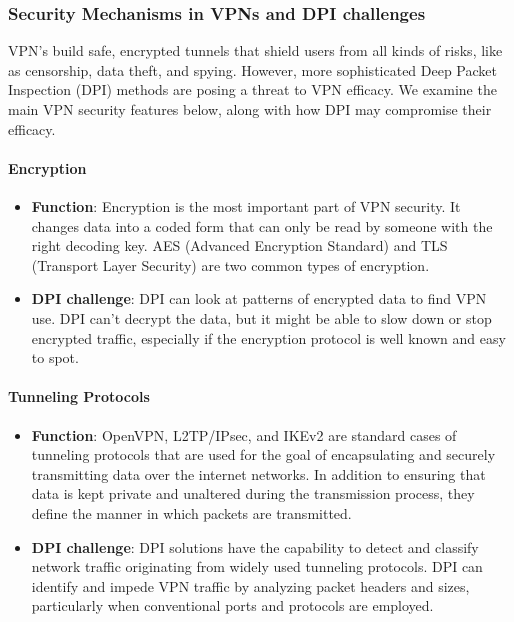 \documentclass[12pt, fleqn, a4paper]{article}
\begin{document}
\subsubsection{Security Mechanisms in VPNs and DPI challenges}
VPN's build safe, encrypted tunnels that shield users from all kinds of risks, like as censorship, data theft, and spying. However, more sophisticated Deep Packet Inspection (DPI) methods are posing a threat to VPN efficacy. We examine the main VPN security features below, along with how DPI may compromise their efficacy.
\paragraph{Encryption}
\begin{itemize}
  \item \textbf{Function}: Encryption is the most important part of VPN security. It changes data into a coded form that can only be read by someone with the right decoding key. AES (Advanced Encryption Standard) and TLS (Transport Layer Security) are two common types of encryption.
  \item \textbf{DPI challenge}: DPI can look at patterns of encrypted data to find VPN use. DPI can't decrypt the data, but it might be able to slow down or stop encrypted traffic, especially if the encryption protocol is well known and easy to spot.
\end{itemize}

\paragraph{Tunneling Protocols}
\begin{itemize}
  \item \textbf{Function}: OpenVPN, L2TP/IPsec, and IKEv2 are standard cases of tunneling protocols that are used for the goal of encapsulating and securely transmitting data over the internet networks. In addition to ensuring that data is kept private and unaltered during the transmission process, they define the manner in which packets are transmitted.
  \item \textbf{DPI challenge}: DPI solutions have the capability to detect and classify network traffic originating from widely used tunneling protocols. DPI can identify and impede VPN traffic by analyzing packet headers and sizes, particularly when conventional ports and protocols are employed.
\end{itemize}
\end{document}
